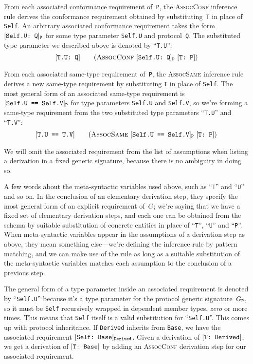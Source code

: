 \documentclass[../generics]{subfiles}
\begin{document}
From each associated conformance requirement of~\texttt{P}, the \textsc{AssocConf} inference rule derives the conformance requirement obtained by substituting~\texttt{T} in place of \texttt{Self}. An arbitrary associated conformance requirement takes the form $[\texttt{Self.U:~Q}]_\texttt{P}$ for some type parameter \texttt{Self.U} and protocol~\texttt{Q}. The substituted type parameter we described above is denoted by ``\texttt{T.U}'':
\begin{gather*}
\AssocConfStepDef
\end{gather*}

From each associated same-type requirement of~\texttt{P}, the \textsc{AssocSame} inference rule derives a new same-type requirement by substituting \texttt{T} in place of \texttt{Self}. The most general form of an associated same-type requirement is $[\texttt{Self.U == Self.V}]_\texttt{P}$ for type parameters \texttt{Self.U} and \texttt{Self.V}, so we're forming a same-type requirement from the two substituted type parameters ``\texttt{T.U}'' and ``\texttt{T.V}'':
\begin{gather*}
\AssocSameStepDef
\end{gather*}

We will omit the associated requirement from the list of assumptions when listing a derivation in a fixed generic signature, because there is no ambiguity in doing so.

A few words about the meta-syntactic variables used above, such as ``\texttt{T}'' and ``\texttt{U}'' and so on. In the conclusion of an elementary derivation step, they specify the most general form of an explicit requirement of~$G$; we're saying that we have a fixed set of elementary derivation steps, and each one can be obtained from the schema by suitable substitution of concrete entities in place of ``\texttt{T}'', ``\texttt{U}'' and ``\texttt{P}''. When meta-syntactic variables appear in the assumptions of a derivation step as above, they mean something else---we're defining the inference rule by pattern matching, and we can make use of the rule as long as a suitable substitution of the meta-syntactic variables matches each assumption to the conclusion of a previous step.

The general form of a type parameter inside an associated requirement is denoted by ``\texttt{Self.U}'' because it's a type parameter for the protocol generic signature~$G_\texttt{P}$, so it must be \texttt{Self} recursively wrapped in dependent member types, \emph{zero} or more times. This means that \texttt{Self} itself is a valid substitution for ``\texttt{Self.U}''. This comes up with protocol inheritance. If \texttt{Derived} inherits from \texttt{Base}, we have the associated requirement $[\texttt{Self:~Base}]_\texttt{Derived}$. Given a derivation of $[\texttt{T:~Derived}]$, we get a derivation of $[\texttt{T:~Base}]$ by adding an \textsc{AssocConf} derivation step for our associated requirement.
\end{document}
